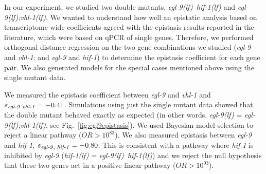 \documentclass[9pt,twocolumn,twoside]{pnas-new}
\newcommand{\gene}[1]{\mbox{\emph{#1}}}
\newcommand{\egl}{\gene{egl-9(lf)}}
\newcommand{\eglvhl}{\gene{egl-9(lf);vhl-1(lf)}}
\newcommand{\eglhif}{\gene{egl-9(lf) hif-1(lf)}}
\newcommand{\hif}{\gene{hif-1(lf)}}
\begin{document}
In our experiment, we studied two double mutants, \eglhif{} and \eglvhl{}. We
wanted to understand how well an epistatic analysis based on transcriptome-wide
coefficients agreed with the epistasis results reported in the literature, which
were based on qPCR of single genes. Therefore, we performed orthogonal distance
regression on the two gene combinations we studied (\gene{egl-9} and
\gene{vhl-1}; and \gene{egl-9} and \gene{hif-1}) to determine the epistasis
coefficient for each gene pair. We also generated models for the special cases
mentioned above using the single mutant data.


We measured the epistasis coefficient between \gene{egl-9} and \gene{vhl-1} and
$s_{\text{\gene{egl-9} \gene{vhl-1}}} = -0.41$. Simulations using just the
single mutant data showed that the double mutant behaved exactly as expected (in
other words, \egl{} = \eglvhl{}, see Fig.~\ref{fig:egl9epistasis}). We used
Bayesian model selection to reject a linear pathway ($OR>10^{83}$). We also
measured epistasis between \gene{egl-9} and \gene{hif-1},
$s_{\text{\gene{egl-9}, \gene{hif-1}}} = -0.80$. This is consistent with a
pathway where \gene{hif-1} is inhibited by \gene{egl-9} (\hif{} =
\eglhif{}) and we reject the null hypothesis that these two genes act in a
positive linear pathway ($OR > 10^{93}$).
\end{document}
